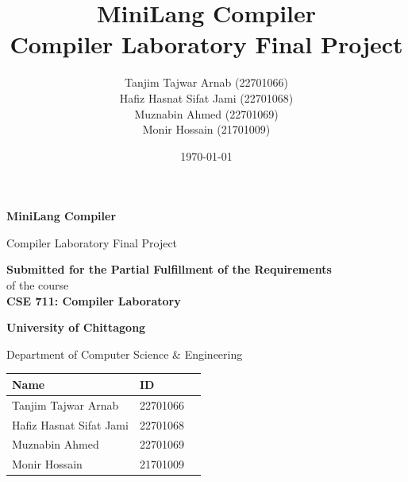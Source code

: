 \documentclass[12pt,a4paper]{report}
\title{
    \Huge \textbf{MiniLang Compiler}\\[0.5cm]
    \Large Compiler Laboratory Final Project
}
\author{
Tanjim Tajwar Arnab (22701066)\\
Hafiz Hasnat Sifat Jami (22701068)\\
Muznabin Ahmed (22701069)\\
Monir Hossain (21701009)
}
\date{\today}
\begin{document}

\begin{titlepage}

\begin{center}

\vspace*{0.5cm}

{\Huge\bfseries\color{primary}
MiniLang Compiler
}

\vspace{0.4cm}

{\Large Compiler Laboratory Final Project}

\vspace{1cm}

\begin{tcolorbox}[
colback=blue!5,
colframe=primary,
width=0.9\textwidth,
arc=3mm
]
\centering
\large
\textbf{Submitted for the Partial Fulfillment of the Requirements}\\[0.2cm]
of the course\\[0.2cm]

\textbf{CSE 711: Compiler Laboratory}
\end{tcolorbox}

\vspace{1cm}

{\Large\bfseries University of Chittagong}

\vspace{0.2cm}

{\large Department of Computer Science \& Engineering}

\vspace{1cm}

\begin{tcolorbox}[
colback=orange!5,
colframe=accent,
width=0.9\textwidth,
title=\textbf{Submitted By}
]

\centering

\begin{tabular}{lll}
\toprule
\textbf{Name} & \textbf{ID} \\
\midrule
Tanjim Tajwar Arnab & 22701066 \\
Hafiz Hasnat Sifat Jami & 22701068 \\
Muznabin Ahmed & 22701069 \\
Monir Hossain & 21701009 \\
\bottomrule
\end{tabular}

\end{tcolorbox}


\end{center}
\end{titlepage}
\end{document}
